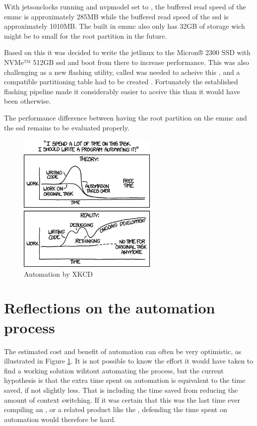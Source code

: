 With \gls{jetsonclocks} running and \gls{nvpmodel} set to , the buffered read speed of the \gls{emmc} is approximately 285MB while the buffered read speed of the \gls{ssd} is approximately 1010MB.
The built in \gls{emmc} also only has 32GB of storage \cite{nvidiaNVIDIAJetsonAGX2019} wich might be to small for the root partition in the future.

Based on this it was decided to write the \gls{jetlinux} to the Micron® 2300 SSD with NVMe™ 512GB \gls{ssd} and boot from there to increase performance.
This was also challenging as a new flashing utility, called  was needed to acheive this \cite{rigerunNVIDIAJetpackFlashing2021}, and a compatible partitioning table had to be created \cite{nvidiaPartitionConfigurationJetson2022}.
Fortunately the established flashing pipeline made it considerably easier to aceive this than it would have been otherwise.

The performance difference between having the root partition on the \gls{emmc} and the \gls{ssd} remains to be evaluated properly.

\begin{figure}[H]
    \centering
    \includegraphics[width=0.6\textwidth]{figures/xkcd_automation.png}
    \caption{Automation by XKCD \cite{xkcdAutomation2014}}
    \label{fig:xkcd_automation}
\end{figure}

\section{Reflections on the automation process}
The estimated cost and benefit of automation can often be very optimistic, as illustrated in Figure \ref{fig:xkcd_automation}.
It is not possible to know the effort it would have taken to find a working solution wihtout automating the process, but the current hypothesis is that the extra time spent on automation is equivalent to the time saved, if not slightly less.
That is including the time saved from reducing the amount of context switching.
If it was certain that this was the last time ever compiling an \jx, or a related \jetson product like the \jo, defending the time spent on automation would therefore be hard.

